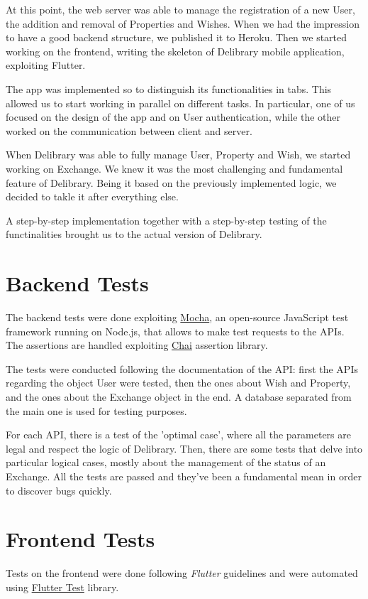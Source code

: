 At this point, the web server was able to manage the registration of a new User, the addition and removal of Properties and Wishes.
When we had the impression to have a good backend structure, we published it to Heroku.
Then we started working on the frontend, writing the skeleton of Delibrary mobile application, exploiting Flutter.

The app was implemented so to distinguish its functionalities in tabs. This allowed us to start working in parallel on different tasks.
In particular, one of us focused on the design of the app and on User authentication, while the other worked on the communication between client and server.

When Delibrary was able to fully manage User, Property and Wish, we started working on Exchange.
We knew it was the most challenging and fundamental feature of Delibrary.
Being it based on the previously implemented logic, we decided to takle it after everything else.

A step-by-step implementation together with a step-by-step testing of the functinalities brought us to the actual version of Delibrary.

\section{Backend Tests}
The backend tests were done exploiting \href{https://mochajs.org}{Mocha}, an open-source JavaScript test framework running on Node.js, that allows to make test requests to the APIs.
The assertions are handled exploiting \href{https://www.chaijs.com/}{Chai} assertion library.

The tests were conducted following the documentation of the API: first the APIs regarding the object User were tested, then the ones about Wish and Property, and the ones about the Exchange object in the end.
A database separated from the main one is used for testing purposes.

For each API, there is a test of the 'optimal case', where all the parameters are legal and respect the logic of Delibrary.
Then, there are some tests that delve into particular logical cases, mostly about the management of the status of an Exchange.
All the tests are passed and they've been a fundamental mean in order to discover bugs quickly.

\section{Frontend Tests}
Tests on the frontend were done following \emph{Flutter} guidelines and were automated using \href{https://api.flutter.dev/flutter/flutter_test/flutter_test-library.html}{Flutter Test} library.

